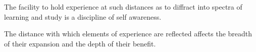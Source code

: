 

The facility to hold experience at such distances as to diffract into
spectra of learning and study is a discipline of self awareness.

The distance with which elements of experience are reflected affects
the breadth of their expansion and the depth of their benefit.

\bye

